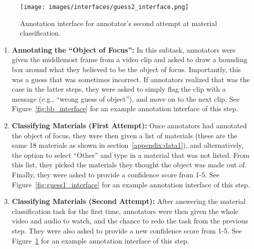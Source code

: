 \documentclass[runningheads]{llncs}
\begin{document}
\begin{figure}[t]
    \centering
  \texttt{[image: images/interfaces/guess2\_interface.png]}
  \caption{Annotation interface for annotator's second attempt at material classification.}
  \label{fig:guess2_interface}
\end{figure}

\begin{enumerate}
    \item \textbf{Annotating the ``Object of Focus'':} In this subtask, annotators were given the middlemost frame from a video clip and asked to draw a bounding box around what they believed to be the object of focus. Importantly, this was a guess that was sometimes incorrect. If annotators realized that was the case in  the latter steps, they were asked to simply flag the clip with a message (e.g., ``wrong guess of object''), and move on to the next clip. See Figure~\ref{fig:bb_interface} for an example annotation interface of this step.
    \item \textbf{Classifying Materials (First Attempt):} Once annotators had annotated the object of focus, they were then given a list of materials (these are the same 18 materials as shown in section~\ref{appendix:data1}), and alternatively, the option to select ``Other'' and type in a material that was not listed. From this list, they picked the materials they thought the object was made out of. Finally, they were asked to provide a confidence score from 1-5. See Figure~\ref{fig:guess1_interface} for an example annotation interface of this step.
    \item \textbf{Classifying Materials (Second Attempt):} After answering the material classification task for the first time, annotators were then given the whole video and audio to watch, and the chance to redo the task from the previous step. They were also asked to provide a new confidence score from 1-5. See Figure~\ref{fig:guess2_interface} for an example annotation interface of this step.
\end{enumerate}
\end{document}

